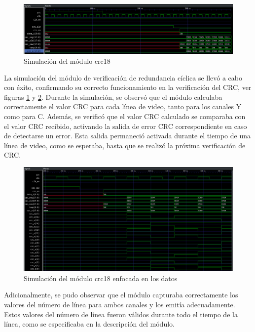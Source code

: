   \begin{figure}[h]
    \centering
    \includegraphics[width=1\textwidth]{./Figures/crc18.png}
    \caption{Simulación del módulo crc18}\label{fig:crc18}
  \end{figure}

  La simulación del módulo de verificación de redundancia cíclica se llevó a cabo
  con éxito, confirmando su correcto funcionamiento en la verificación del CRC,
  ver figuras \ref{fig:crc18} y \ref{fig:crc18-z}\@.
  Durante la simulación, se observó que el módulo calculaba correctamente el
  valor CRC para cada línea de video, tanto para los canales Y como para C.
  Además, se verificó que el valor CRC calculado se comparaba con el valor CRC
  recibido, activando la salida de error CRC correspondiente en caso de detectarse
  un error. Esta salida permaneció activada durante el tiempo de una línea de
  video, como se esperaba, hasta que se realizó la próxima verificación de CRC\@.

  \begin{figure}[h]
    \centering
    \includegraphics[width=1\textwidth]{./Figures/crc18_zoom.png}
    \caption{Simulación del módulo crc18 enfocada en los datos}\label{fig:crc18-z}
  \end{figure}

  Adicionalmente, se pudo observar que el módulo capturaba correctamente los
  valores del número de línea para ambos canales y los emitía adecuadamente.
  Estos valores del número de línea fueron válidos durante todo el tiempo de la
  línea, como se especificaba en la descripción del módulo.

